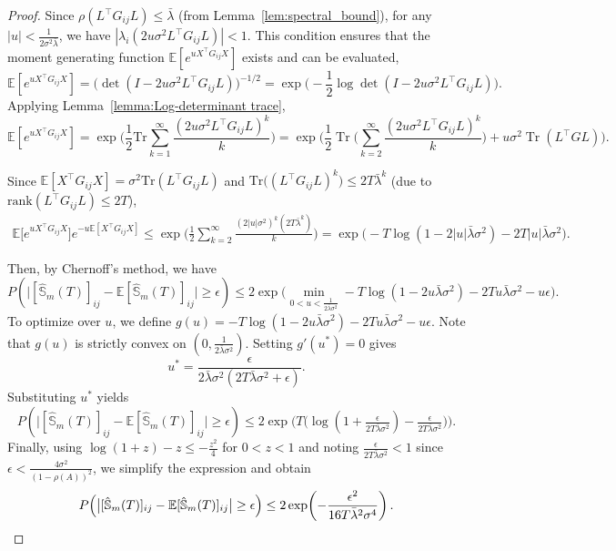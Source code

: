 \documentclass[11pt]{article}
\DeclareMathOperator{\Tr}{Tr}
\begin{document}
\begin{proof}
\noindent
Since $\rho(L^\top G_{ij}L)\le\bar{\lambda}$ (from Lemma~\ref{lem:spectral_bound}), for any $|u|<\tfrac{1}{2\sigma^2\bar{\lambda}}$, we have $|\lambda_i(2u\sigma^2L^\top G_{ij}L)|<1.$
This condition ensures that the moment generating function
$\mathbb{E}[e^{uX^\top G_{ij}X}]$ exists and can be evaluated, 
\[
\mathbb{E}[e^{uX^\top G_{ij} X}]
= \big(\det(I-2u\sigma^2L^\top G_{ij}L)\big)^{-1/2}
= \exp\!\Big(-\frac{1}{2}\log\det(I-2u\sigma^2L^\top G_{ij}L)\Big).
\]
Applying Lemma~\ref{lemma:Log-determinant trace},
\[
\mathbb{E}[e^{uX^\top G_{ij} X}]
= \exp\!\Big(\frac{1}{2}\mathrm{Tr}\!\sum_{k=1}^\infty
\frac{(2u\sigma^2L^\top G_{ij}L)^k}{k}\Big)=\exp\Big(\frac{1}{2} \Tr\Big(\sum_{k=2}^{\infty} \frac{(2u\sigma^2L^\top G_{ij}L)^k}{k}\Big) + u \sigma^2 \Tr(L^\top GL) \Big) .
\]



Since
$\mathbb{E}[X^\top G_{ij}X]=\sigma^2\mathrm{Tr}(L^\top G_{ij}L)$
and $\mathrm{Tr}\big((L^\top G_{ij}L)^k\big)\le 2T\bar{\lambda}^k$ (due to $\mathrm{rank}(L^\top G_{ij}L)\le 2T$),
\begin{align*}
\mathbb{E}\big[e^{uX^\top G_{ij} X}\big]e^{-u\mathbb{E}[X^\top G_{ij} X]} 
\le \exp\!\Big(\frac{1}{2}\sum_{k=2}^\infty
\frac{(2|u|\sigma^2)^k(2T\bar{\lambda}^k)}{k}\Big)
= \exp\!\Big(-T\log(1-2|u|\bar{\lambda}\sigma^2)-2T|u|\bar{\lambda}\sigma^2\Big).
\end{align*}

Then, by Chernoff's method, we have
\[
P\!\left(\big|[\hat{\mathbb{S}}_m(T)]_{ij}-\mathbb{E}[\hat{\mathbb{S}}_m(T)]_{ij}\big|\ge\epsilon\right)
\le
2\exp\Big( \min_{0<u<\frac{1}{2\bar{\lambda}\sigma^2}}  -T \log(1-2u\bar{\lambda}\sigma^2) - 2Tu\bar{\lambda}\sigma^2  - u\epsilon \Big).
\]
To optimize over $u$, we define
$g(u)=-T\log(1-2u\bar{\lambda}\sigma^2)-2Tu\bar{\lambda}\sigma^2-u\epsilon$. Note that $g(u)$ is strictly convex on $(0,\tfrac{1}{2\bar{\lambda}\sigma^2})$.
Setting $g'(u^*)=0$ gives
\[
u^*=\frac{\epsilon}{2\bar{\lambda}\sigma^2(2T\bar{\lambda}\sigma^2+\epsilon)}.
\]
Substituting $u^*$ yields
\[
P\!\left(\big|[\hat{\mathbb{S}}_m(T)]_{ij}-\mathbb{E}[\hat{\mathbb{S}}_m(T)]_{ij}\big|\ge\epsilon\right)
\le
2\exp\!\Big(
T\big(\log(1+\tfrac{\epsilon}{2T\bar{\lambda}\sigma^2})
-\tfrac{\epsilon}{2T\bar{\lambda}\sigma^2}\big)
\Big).
\]
Finally, using $\log(1+z)-z\le -\tfrac{z^2}{4}$ for $0<z<1$
and noting $\tfrac{\epsilon}{2T\bar{\lambda}\sigma^2}<1$
since $\epsilon<\tfrac{4\sigma^2}{(1-\rho(A))^2}$,
we simplify the expression and obtain
\[
P\!\left(\big|[\hat{\mathbb{S}}_m(T)]_{ij}-\mathbb{E}[\hat{\mathbb{S}}_m(T)]_{ij}\big|\ge\epsilon\right)
\le
2\exp\!\left(-\frac{\epsilon^2}{16T\bar{\lambda}^2\sigma^4}\right).
\qedhere
\]
\end{proof}
\end{document}
